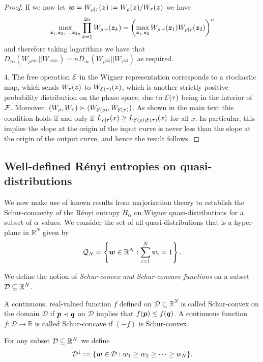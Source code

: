 \documentclass[pra,
aps,
twocolumn,
superscriptaddress,
groupedaddress,
nofootinbib,
reprint
]{revtex4-1}
\begin{document}
\begin{proof}
If we now let $\boldsymbol{w} = W_{\rho|\tau}(\bm{z}) := W_{\rho}(\bm{z}) /W_{\tau}(\bm{z})$ we have
\begin{equation}
\max_{\bm{z}_1, \bm{z}_2, \dots ,\bm{z}_{2n}} \prod_{k=1}^{2n} W_{\rho|\tau}(\bm{z}_k) = \left( \max_{\bm{z}_1, \bm{z}_2} W_{\rho|\tau}(\bm{z}_1)W_{\rho|\tau}(\bm{z}_2) \right)^n
\end{equation}
and therefore taking logarithms we have that $D_\infty(W_{\rho^{\otimes 2n}} || W_{\tau^{\otimes 2n}}) = n D_\infty(W_{\rho^{\otimes 2}} || W_{\tau^{\otimes 2}})$ as required.

4. The free operation ${\mathcal E}$ in the Wigner representation corresponds to a stochastic map, which sends $W_\tau(\bm{z})$ to $W_{{\mathcal E}(\tau)}(\bm{z})$, which is another strictly positive probability distribution on the phase space, due to ${\mathcal E}(\tau)$ being in the interior of ${\mathcal F}$. Moreover, $(W_\rho, W_\tau ) \succ (W_{{\mathcal E}(\rho)} , W_{{\mathcal E}(\tau)})$. As shown in the main text this condition holds if and only if $L_{\rho|\tau}(x) \ge L_{{\mathcal E}(\rho)|{\mathcal E}(\tau)}(x)$ for all $x$. In particular, this implies the slope at the origin of the input curve is never less than the slope at the origin of the output curve, and hence the result follows.
\end{proof}

\subsection{Well-defined R\'{e}nyi entropies on quasi-distributions}

We now make use of known results from majorization theory to establish the Schur-concavity of the R\'{e}nyi entropy $H_\alpha$ on Wigner quasi-distributions for a subset of $\alpha$ values. We consider the set of all quasi-distributions that is a hyper-plane in $\mathbb{R}^N$ given by
\begin{equation}
	\mathcal{Q}_N = \left\{ \boldsymbol{w} \in \mathbb{R}^N: \sum_{i=1}^N w_i = 1 \right\}.
\end{equation}

We define the notion of \emph{Schur-convex and Schur-convave functions} on a subset ${\mathcal D} \subseteq \mathbb{R}^N$.
\begin{definition} 
	A continuous, real-valued function $f$ defined on $\mathcal{D} \subseteq \mathbb{R}^N$ is called Schur-convex on the domain $\mathcal{D}$ if $\boldsymbol{p} \prec \boldsymbol{q}$ on $\mathcal{D}$ implies that $f(\boldsymbol{p}) \le f(\boldsymbol{q})$. A continuous function $f:\mathcal{D} \rightarrow \mathbb{R}$ is called Schur-concave if $(-f)$ is Schur-convex.
\end{definition}
For any subset ${\mathcal D} \subseteq \mathbb{R}^N$ we define
\begin{equation}
	\mathcal{D}^\downarrow := \{ \boldsymbol{w} \in \mathcal{D} : w_1 \ge w_2 \ge \cdots \ge w_N\}.
\end{equation}
\end{document}
